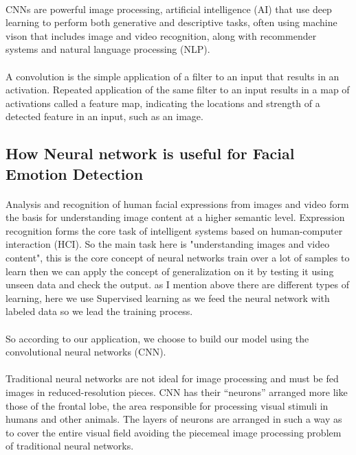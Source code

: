 \paragraph{}
CNNs are powerful image processing, artificial intelligence (AI) that use deep learning to perform both generative and descriptive tasks, often using machine vison that includes image and video recognition, along with recommender systems and natural language processing (NLP).
\paragraph{}
A convolution is the simple application of a filter to an input that results in an activation. Repeated application of the same filter to an input results in a map of activations called a feature map, indicating the locations and strength of a detected feature in an input, such as an image.
\subsection{How Neural network is  useful for Facial Emotion Detection}
\paragraph{}
Analysis and recognition of human facial expressions
from images and video form the basis for understanding
image content at a higher semantic level. Expression
recognition forms the core task of intelligent systems
based on human-computer interaction (HCI). So the main task here is "understanding images and video content", this is the core concept of neural networks train over a lot of samples to learn then we can apply the concept of generalization on it by testing it using unseen data and check the output. 
as I mention above  there are different types of learning, here we  use Supervised learning as we feed the neural network with labeled data so we lead the training process.
\paragraph{}
So according to our application, we choose to build our model using the convolutional neural networks (CNN).
\paragraph{}
Traditional neural networks are not ideal for image processing and must be fed images in reduced-resolution pieces. CNN has their “neurons” arranged more like those of the frontal lobe, the area responsible for processing visual stimuli in humans and other animals. The layers of neurons are arranged in such a way as to cover the entire visual field avoiding the piecemeal image processing problem of traditional neural networks.

